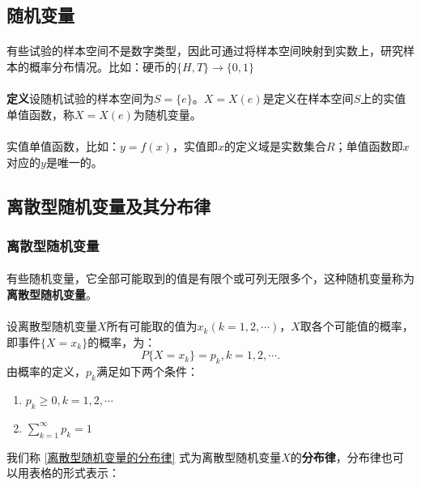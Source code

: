 \subsection{随机变量}
\paragraph{}
有些试验的样本空间不是数字类型，因此可通过将样本空间映射到实数上，研究样本的概率分布情况。比如：硬币的$\{H,T\} \to \{0, 1\}$
\paragraph{}
\textbf{定义\;}设随机试验的样本空间为$S=\{e\}$。$X = X(e)$是定义在样本空间$S$上的实值单值函数，称$X=X(e)$为随机变量。

\paragraph{}
实值单值函数，比如：$y=f(x)$，实值即$x$的定义域是实数集合$R$；单值函数即$x$对应的$y$是唯一的。

\subsection{离散型随机变量及其\textbf{分布律}}
\subsubsection{离散型随机变量}
\paragraph{}
有些随机变量，它全部可能取到的值是有限个或可列无限多个，这种随机变量称为\textbf{离散型随机变量}。

\paragraph{}
设离散型随机变量$X$所有可能取的值为$x_k(k=1,2,\cdots)$，$X$取各个可能值的概率，即事件$\{X = x_k\}$的概率，为：
\begin{equation}
  \label{离散型随机变量的分布律}
  P\{X = x_k\} = p_k, k = 1, 2, \cdots.
\end{equation}
由概率的定义，$p_k$满足如下两个条件：

\label{离散型随机变量的条件}
\begin{enumerate}
  \item $p_k \geq 0, k = 1, 2, \cdots$
  \item $\displaystyle \sum_{k=1}^\infty p_k = 1$
\end{enumerate}
我们称 \eqref{离散型随机变量的分布律} 式为离散型随机变量$X$的\textbf{分布律}，分布律也可以用表格的形式表示：

